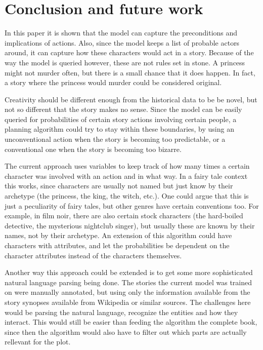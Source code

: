 \section{Conclusion and future work}

In this paper it is shown that the model can capture the preconditions and
implications of actions. Also, since the model keeps a list of probable actors
around, it can capture how these characters would act in a story. Because of the
way the model is queried however, these are not rules set in stone. A princess
might not murder often, but there is a small chance that it does happen. In
fact, a story where the princess would murder could be considered original.

Creativity should be different enough from the historical data to be be novel,
but not so different that the story makes no sense. Since the model can be
easily queried for probabilities of certain story actions involving certain
people, a planning algorithm could try to stay within these boundaries, by
using an unconventional action when the story is becoming too predictable, or a
conventional one when the story is becoming too bizarre.

The current approach uses variables to keep track of how many times a certain
character was involved with an action and in what way. In a fairy tale context
this works, since characters are usually not named but just know by their
archetype (the princess, the king, the witch, etc.). One could argue that this
is just a peculiarity of fairy tales, but other genres have certain conventions
too. For example, in film noir, there are also certain stock characters (the
hard-boiled detective, the mysterious nightclub singer), but usually these are
known by their names, not by their archetype. An extension of this algorithm
could have characters with attributes, and let the probabilities be dependent on
the character attributes instead of the characters themselves.

Another way this approach could be extended is to get some more sophisticated
natural language parsing being done. The stories the current model was trained
on were manually annotated, but using only the information available from the
story synopses available from Wikipedia or similar sources. The challenges here
would be parsing the natural language, recognize the entities and how they
interact. This would still be easier than feeding the algorithm the complete
book, since then the algorithm would also have to filter out which parts are
actually rellevant for the plot.
